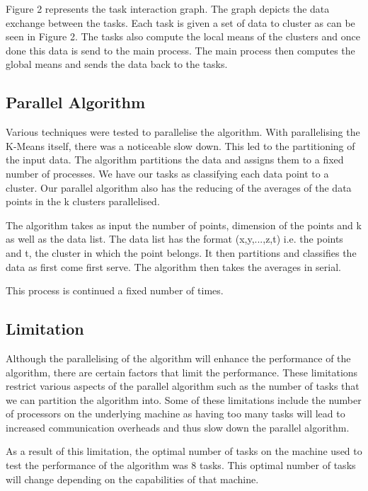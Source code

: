 \documentclass[12pt]{article}
\begin{document}
    			\begin{flushleft}
    				Figure 2 represents the task interaction graph. The graph depicts the data exchange between the tasks. Each task is given a set of data to cluster as can be seen in Figure 2. The tasks also compute the local means of the clusters and once done this data is send to the main process. The main process then computes the global means and sends the data back to the tasks.
    			\end{flushleft}
    	
    	\subsection{Parallel Algorithm}
    		\begin{flushleft}
    			Various techniques were tested to parallelise the algorithm. With parallelising the K-Means itself, there was a noticeable slow down. 
This led to the partitioning of the input data. The algorithm partitions the data and assigns them to a fixed number of processes.
We have our tasks as classifying each data point to a cluster. Our parallel algorithm also has the reducing of the averages of the data points in the k clusters parallelised.
    		\end{flushleft}
    		
    		\begin{flushleft}
    			The algorithm takes as input the number of points, dimension of the points and k as well as the data list. The data list has the format (x,y,...,z,t) i.e. the points and t, the cluster in which the point belongs. It then partitions and classifies the data as first come first serve. The algorithm then takes the averages in serial.
    		\end{flushleft}
    		
    		\begin{flushleft}
    			This process is continued a fixed number of times.
    		\end{flushleft}
    	
    	\subsection{Limitation}
 			\begin{flushleft}
 				Although the parallelising of the algorithm will enhance the performance of the algorithm, there are certain factors that limit the performance. These limitations restrict various aspects of the parallel algorithm such as the number of tasks that we can partition the algorithm into. Some of these limitations include the number of processors on the underlying machine as having too many tasks will lead to increased communication overheads and thus slow down the parallel algorithm. 
 			\end{flushleft}
 			\begin{flushleft}
 				As a result of this limitation, the optimal number of tasks on the machine used to test the performance of the algorithm was 8 tasks. This optimal number of tasks will change depending on the capabilities of that machine.
 			\end{flushleft}
\end{document}

